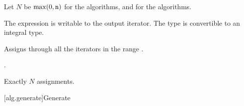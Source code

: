 \begin{itemdescr}
\pnum
Let $N$ be $\max(0, \tcode{n})$ for the  algorithms, and
 for the  algorithms.

\pnum
\mandates
The expression 
is writable to the output iterator.
The type  is convertible
to an integral type.

\pnum
\effects
Assigns 
through all the iterators in the range .

\pnum
\returns
{}.

\pnum
\complexity
Exactly $N$ assignments.
\end{itemdescr}

[alg.generate]{Generate}

